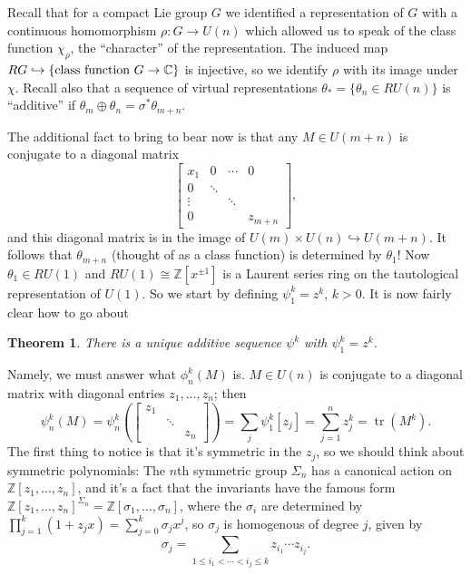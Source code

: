 \documentclass{article}
\newcommand{\Z}{\mathbb{Z}}
\newcommand{\C}{\mathbb{C}}
\newcommand{\into}{\hookrightarrow}
\DeclareMathOperator{\tr}{tr}
\newtheorem{thm}{Theorem}[section]
\begin{document}
Recall that for a compact Lie group $G$ we identified a representation of $G$ with a continuous homomorphism $\rho: G \to U(n)$ which allowed us to speak of the class function $\chi_\rho$, the ``character'' of the representation.  The induced map $RG \into \{\hbox{class function $G \to \C$}\}$ is injective, so we identify $\rho$ with its image under $\chi$.  Recall also that a sequence of virtual representations $\theta_* = \{\theta_n \in RU(n)\}$ is ``additive'' if $\theta_m \oplus \theta_n = \sigma^* \theta_{m+n}$.

The additional fact to bring to bear now is that any $M \in U(m+n)$ is conjugate to a diagonal matrix \[\left[\begin{array}{cccc}x_1 & 0 & \cdots & 0 \\ 0 & \ddots \\ \vdots & & \ddots \\ 0 & & & z_{m+n}\end{array}\right],\] and this diagonal matrix is in the image of $U(m) \times U(n) \into U(m+n)$.  It follows that $\theta_{m+n}$ (thought of as a class function) is determined by $\theta_1$!  Now $\theta_1 \in RU(1)$ and $RU(1) \cong \Z[x^{\pm 1}]$ is a Laurent series ring on the tautological representation of $U(1)$.  So we start by defining $\psi_1^k = z^k$, $k > 0$.  It is now fairly clear how to go about
\begin{thm}
There is a unique additive sequence $\psi^k$ with $\psi^k_1 = z^k$.
\end{thm}
Namely, we must answer what $\phi_n^k(M)$ is.  $M \in U(n)$ is conjugate to a diagonal matrix with diagonal entries $z_1, \ldots, z_n$; then \[\psi^k_n(M) = \psi^k_n \left( \left[ \begin{array}{ccc}z_1 \\ & \ddots \\ & & z_n\end{array} \right]\right) = \sum_j \psi^k_1 [z_j] = \sum_{j=1}^n z_j^k = \tr(M^k).\]  The first thing to notice is that it's symmetric in the $z_j$, so we should think about symmetric polynomials: The $n$th symmetric group $\Sigma_n$ has a canonical action on $\Z[z_1, \ldots, z_n]$, and it's a fact that the invariants have the famous form $\Z[z_1, \ldots, z_n]^{\Sigma_n} = \Z[\sigma_1, \ldots, \sigma_n]$, where the $\sigma_i$ are determined by $\prod_{j=1}^k (1+z_j x) = \sum_{j=0}^k \sigma_j x^j$, so $\sigma_j$ is homogenous of degree $j$, given by \[\sigma_j = \sum_{1 \le i_1 < \cdots < i_j \le k} z_{i_1} \cdots z_{i_j}.\]
\end{document}
